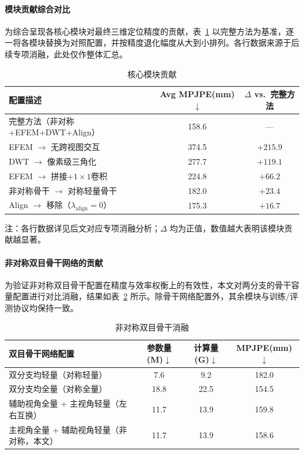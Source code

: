 \paragraph{模块贡献综合对比}
为综合呈现各核心模块对最终三维定位精度的贡献，表~\ref{tab:ablation_incremental} 以完整方法为基准，逐一将各模块替换为对照配置，并按精度退化幅度从大到小排列。各行数据来源于后续专项消融，此处仅作整体汇总。
\begin{table}[htbp]
  \centering
  \small
  \renewcommand{\arraystretch}{1.15}
\caption{核心模块贡献}
  \label{tab:ablation_incremental}
  \begin{tabular}{lcc}
    \toprule
    配置描述 & Avg MPJPE(mm)$\downarrow$ & $\Delta$ vs.\ 完整方法 \\
    \midrule
    完整方法（非对称+EFEM+DWT+Align） & 158.6 & — \\
    EFEM $\rightarrow$ 无跨视图交互 & 374.5 & $+215.9$ \\
    DWT $\rightarrow$ 像素级三角化 & 277.7 & $+119.1$ \\
    EFEM $\rightarrow$ 拼接+$1\times1$卷积 & 224.8 & $+66.2$ \\
    非对称骨干 $\rightarrow$ 对称轻量骨干 & 182.0 & $+23.4$ \\
    Align $\rightarrow$ 移除（$\lambda_{\text{align}}=0$） & 175.3 & $+16.7$ \\
    \bottomrule
  \end{tabular}

  \vspace{2pt}
  \noindent\footnotesize 注：各行数据详见后文对应专项消融分析；$\Delta$ 均为正值，数值越大表明该模块贡献越显著。
\end{table}
\paragraph{非对称双目骨干网络的贡献}
为验证非对称双目骨干配置在精度与效率权衡上的有效性，本文对两分支的骨干容量配置进行对比消融，结果如表~\ref{tab:ablation_asym_stereo} 所示。除骨干网络配置外，其余模块与训练/评测协议均保持一致。
\begin{table}[htbp]
  \centering
  \small
\caption{非对称双目骨干消融}
  \label{tab:ablation_asym_stereo}
  \begin{tabular}{lccc}
    \toprule
    双目骨干网络配置 & 参数量(M)$\downarrow$ & 计算量(G)$\downarrow$ & MPJPE(mm)$\downarrow$ \\
    \midrule
    双分支均轻量（对称轻量） & 7.6 & 9.2 & 182.0 \\
    双分支均全量（对称全量） & 18.8 & 22.5 & 154.5 \\
    辅助视角全量 + 主视角轻量（左右互换） & 11.7 & 13.9 & 159.8 \\
    主视角全量 + 辅助视角轻量（非对称，本文） & 11.7 & 13.9 & 158.6 \\
    \bottomrule
  \end{tabular}
\end{table}

